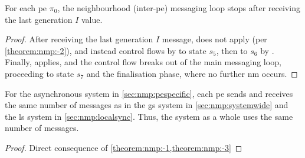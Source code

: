 \begin{theorem}\label{theorem:nmp:-3}
    For each \gls{pe} $\pi_0$, the neighbourhood (inter-\gls{pe}) messaging loop stops after receiving the last generation $I$ value.
\end{theorem}

\begin{proof}
    After receiving the last generation \(I\) message,  does not apply (per \cref{theorem:nmp:-2}), and instead control flows by  to state \(s_5\), then to \(s_6\) by .  Finally,  applies, and the control flow breaks out of the main messaging loop, proceeding to state \(s_7\) and the finalisation phase, where no further \gls{nm} occurs. 
\end{proof}

\begin{theorem}\label{theorem:nmp:-4}
    For the asynchronous system in \cref{sec:nmp:pespecific}, 
    each \gls{pe} sends and receives the same number of messages as in the \gls{gs} system in \cref{sec:nmp:systemwide} and the \gls{ls} system in \cref{sec:nmp:localsync}.   
    Thus, the system as a whole uses the same number of messages.
\end{theorem}

\begin{proof}
    Direct consequence of \cref{theorem:nmp:-1,theorem:nmp:-3}
\end{proof}

